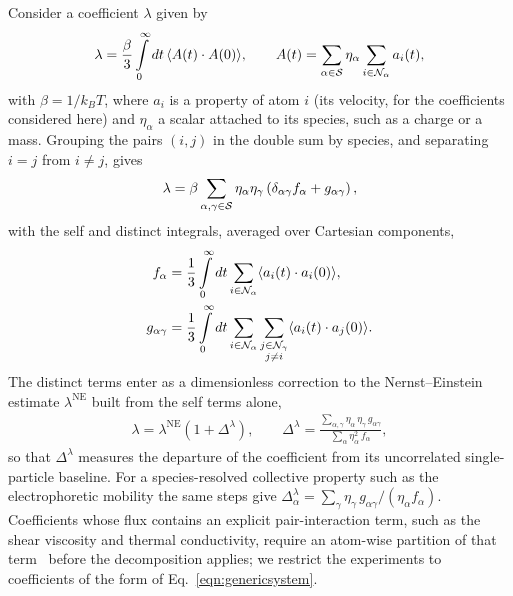 Consider a coefficient $\lambda$ given by
\begin{align}
    \lambda = \frac{\beta}{3} \int\limits_{0}^{\infty} dt \, \langle A(t)\cdot A(0) \rangle,
    \qquad
    A(t) = \sum\limits_{\alpha \in \mathcal{S}} \eta_{\alpha} \sum\limits_{i \in \mathcal{N}_{\alpha}} a_{i}(t),
    \label{eqn:genericsystem}
\end{align}
with $\beta = 1/k_{B}T$, where $a_{i}$ is a property of atom $i$ (its velocity, for the coefficients considered here) and $\eta_{\alpha}$ a scalar attached to its species, such as a charge or a mass.
Grouping the pairs $(i, j)$ in the double sum by species, and separating $i = j$ from $i \neq j$, gives
\begin{align}
    \lambda = \beta \sum\limits_{\alpha, \gamma \in \mathcal{S}} \eta_{\alpha} \eta_{\gamma} \left( \delta_{\alpha\gamma} f_{\alpha} + g_{\alpha\gamma} \right),
    \label{eqn:expansion}
\end{align}
with the self and distinct integrals, averaged over Cartesian components,
\begin{align}
    f_{\alpha} &= \frac{1}{3} \int\limits_{0}^{\infty} dt \sum\limits_{i \in \mathcal{N}_{\alpha}} \langle a_{i}(t)\cdot a_{i}(0) \rangle, \nonumber \\
    g_{\alpha \gamma} &= \frac{1}{3} \int\limits_{0}^{\infty} dt \sum\limits_{i \in \mathcal{N}_{\alpha}} \sum\limits_{\substack{j \in \mathcal{N}_{\gamma} \\ j \neq i}} \langle a_{i}(t)\cdot a_{j}(0) \rangle.
    \label{eqn:fgdefs}
\end{align}
The distinct terms enter as a dimensionless correction to the Nernst--Einstein estimate $\lambda^{\text{NE}}$ built from the self terms alone,
\begin{align}
    \lambda = \lambda^{\text{NE}} \left(1 + \Delta^{\lambda}\right), \qquad
    \Delta^{\lambda} = \frac{\sum_{\alpha, \gamma} \eta_{\alpha}\, \eta_{\gamma}\, g_{\alpha \gamma}}
                           {\sum_{\alpha} \eta_{\alpha}^{2}\, f_{\alpha}},
    \label{eqn:full-correction}
\end{align}
so that $\Delta^{\lambda}$ measures the departure of the coefficient from its uncorrelated single-particle baseline.
For a species-resolved collective property such as the electrophoretic mobility the same steps give $\Delta^{\lambda}_{\alpha} = \sum_{\gamma} \eta_{\gamma}\, g_{\alpha\gamma} / (\eta_{\alpha} f_{\alpha})$.
Coefficients whose flux contains an explicit pair-interaction term, such as the shear viscosity and thermal conductivity, require an atom-wise partition of that term~\cite{irving1950} before the decomposition applies; we restrict the experiments to coefficients of the form of Eq.~\eqref{eqn:genericsystem}.

